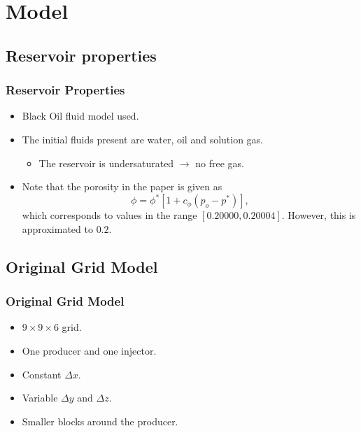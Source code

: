 \section{Model}

\subsection{Reservoir properties}
\begin{frame}
    \frametitle{Reservoir Properties}
    \begin{itemize}
        \item Black Oil fluid model used.
        \item The initial fluids present are water, oil and solution gas.
        \begin{itemize}
            \item The reservoir is undersaturated $\rightarrow$ no free gas.
        \end{itemize}
        \pause
        \item Note that the porosity in the paper is given as
        \begin{equation}
            \phi = \phi^* [1 + c_\phi (p_o - p^*)],
        \end{equation}
        which corresponds to values in the range $[0.20000,0.20004]$. However, this is approximated to $0.2$.
    \end{itemize}
\end{frame}

\subsection{Original Grid Model}
\begin{frame}
    \frametitle{Original Grid Model}
    \begin{itemize}
        \item $9 \times 9 \times 6$ grid.
        \item One producer and one injector.
        \item Constant $\Delta x$.
        \item Variable $\Delta y$ and $\Delta z$.
        \item Smaller blocks around the producer.
    \end{itemize}
\end{frame}



